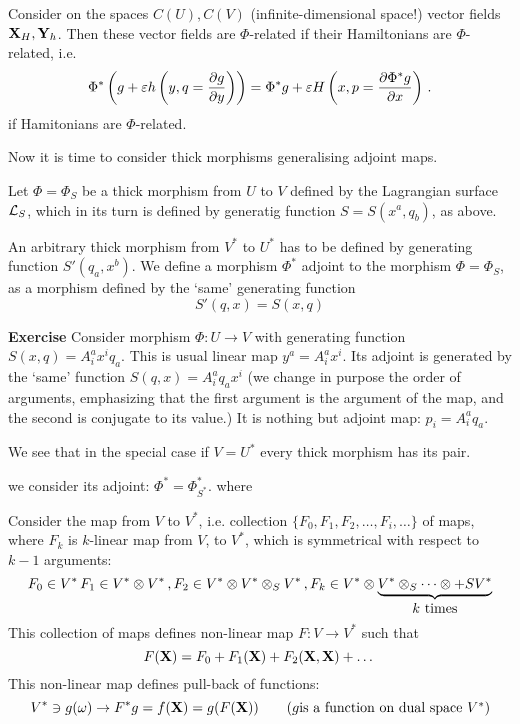   Consider on the spaces $C(U), C(V)$ (infinite-dimensional space!)
vector fields
    ${\bf X}_H, {\bf Y}_h$. Then these vector fields
are $\Phi$-related if their Hamiltonians are $\Phi$-related, i.e.
              $$
 \Phi^*\left(g+\varepsilon h\left(y, q={\partial g\over \partial y}\right)\right)=
 \Phi^*g+\varepsilon H\left(x, p={\partial \Phi^*g\over \partial x}\right)\,.
              $$
if Hamitonians are $\Phi$-related.



Now it is time to consider thick morphisms generalising adjoint maps.

  Let $\Phi=\Phi_S$ be a thick morphism from $U$ to $V$ defined by the
 Lagrangian surface ${\cal L}_S$, which in its turn
is defined by generatig function  $S=S(x^a,q_b)$, as above.

   An arbitrary thick morphism from $V^*$ to $U^*$
has to be defined by generating function $S'(q_a,x^b)$.
   We define a morphism  $\Phi^*$
adjoint to the morphism $\Phi=\Phi_S$, as a morphism defined
by the `same' generating function
             $$
      S'(q,x)=S(x,q)
                  $$

{\bf Exercise} Consider morphism $\Phi\colon U\to V$ 
with generating function
   $S(x,q)=A_{i}^a x^iq_a$.  This is usual linear map  $y^a=A_i^ax^i$.
  Its adjoint is generated by the `same' function
  $S(q,x)=A_i^a q_a x^i$ (we change in purpose the order 
of arguments, emphasizing that the first argument is the argument of the map,
and the second is conjugate to its value.)
It is nothing but adjoint map: $p_i=A_i^aq_a$.


We see that in the special case
if $V=U^*$ every thick morphism has its pair. 


 


we consider its adjoint: $\Phi^*=\Phi^*_{S^*}$. where  



  Consider the map from
   $V$ to $V^*$, i.e.  collection
   $\{F_0,  F_1, F_2,\dots, F_i,\dots\}$ of maps, where
   $F_k$ is $k$-linear map from $V$, to $V^*$,
which is symmetrical with respect to 
$k-1$ arguments:  
              $$
F_0\in V^*\,   F_1\in V^*\otimes V^*\,,
 F_2\in V^*\otimes  V^*\otimes_S V^*\,,
            F_k\in V^*\otimes \underbrace{V^*\otimes_S\dots\otimes+S V^*}
                            _{\hbox {$k$ times}}
              $$
This collection of maps defines non-linear map $F\colon V\to V^*$
such that
      $$
    F({\bf X})=F_0+F_1({\bf X})+F_2({\bf X},{\bf X})+\dots
      $$
This non-linear map defines pull-back of functions:
                   $$
V^*\ni g(\omega)\to F^*g=f({\bf X})=g(F({\bf X}))\qquad
   (g \hbox {is a function on dual space $V^*$})
                   $$

